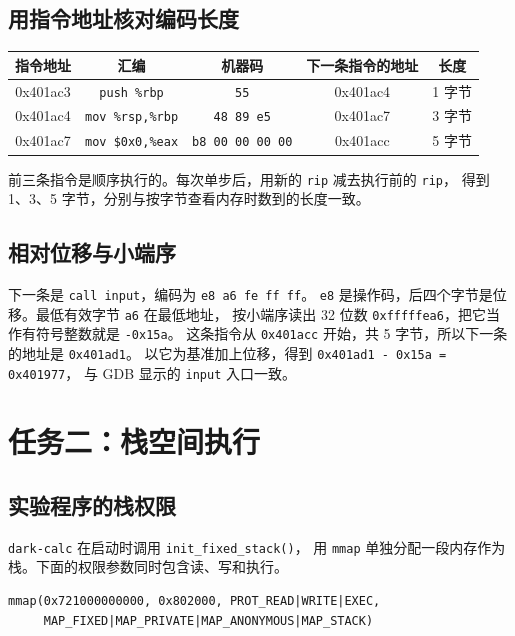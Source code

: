 \documentclass[UTF8,a4paper,12pt,fontset=windows]{ctexart}
\newcommand{\code}[1]{\texttt{#1}}
\begin{document}
\subsection{用指令地址核对编码长度}

\begin{center}
\begin{tabular}{|c|c|c|c|c|}
\hline
指令地址 & 汇编 & 机器码 & 下一条指令的地址 & 长度 \\
\hline
0x401ac3 & \code{push \%rbp} & \code{55} & 0x401ac4 & 1 字节 \\
\hline
0x401ac4 & \code{mov \%rsp,\%rbp} & \code{48 89 e5} & 0x401ac7 & 3 字节 \\
\hline
0x401ac7 & \code{mov \$0x0,\%eax} & \code{b8 00 00 00 00} & 0x401acc & 5 字节 \\
\hline
\end{tabular}
\end{center}

前三条指令是顺序执行的。每次单步后，用新的 \code{rip} 减去执行前的 \code{rip}，
得到 1、3、5 字节，分别与按字节查看内存时数到的长度一致。

\subsection{相对位移与小端序}

下一条是 \code{call input}，编码为 \code{e8 a6 fe ff ff}。
\code{e8} 是操作码，后四个字节是位移。最低有效字节 \code{a6} 在最低地址，
按小端序读出 32 位数 \code{0xfffffea6}，把它当作有符号整数就是 \code{-0x15a}。
这条指令从 \code{0x401acc} 开始，共 5 字节，所以下一条的地址是 \code{0x401ad1}。
以它为基准加上位移，得到 \code{0x401ad1 - 0x15a = 0x401977}，
与 GDB 显示的 \code{input} 入口一致。

\section{任务二：栈空间执行}

\subsection{实验程序的栈权限}

\code{dark-calc} 在启动时调用 \code{init\_fixed\_stack()}，
用 \code{mmap} 单独分配一段内存作为栈。下面的权限参数同时包含读、写和执行。

\begin{lstlisting}
mmap(0x721000000000, 0x802000, PROT_READ|WRITE|EXEC,
     MAP_FIXED|MAP_PRIVATE|MAP_ANONYMOUS|MAP_STACK)
\end{lstlisting}
\end{document}
